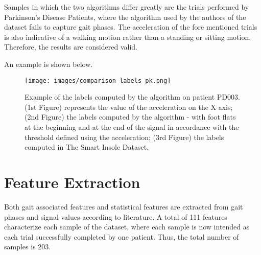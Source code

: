 Samples in which the two algorithms differ greatly are the trials performed by Parkinson's Disease Patients, where the algorithm used by the authors of the dataset fails to capture gait phases. The acceleration of the fore mentioned trials is also indicative of a walking motion rather than a standing or sitting motion. Therefore, the results are considered valid.

An example is shown below.

\begin{figure}[ht!]
    \centering
    \texttt{[image: images/comparison labels pk.png]}
    \caption{Example of the labels computed by the algorithm on patient PD003. (1st Figure) represents the value of the acceleration on the X axis; (2nd Figure) the labels computed by the algorithm - with foot flats at the beginning and at the end of the signal in accordance with the threshold defined using the acceleration; (3rd Figure) the labels computed in The Smart Insole Dataset.}
    \label{fig:Example of the labels computed by the algorithm on patient PD003.}
\end{figure}


\section{Feature Extraction}

Both gait associated features and statistical features are extracted from gait phases and signal values according to literature. A total of 111 features characterize each sample of the dataset, where each sample is now intended as each trial successfully completed by one patient. Thus, the total number of samples is 203.

